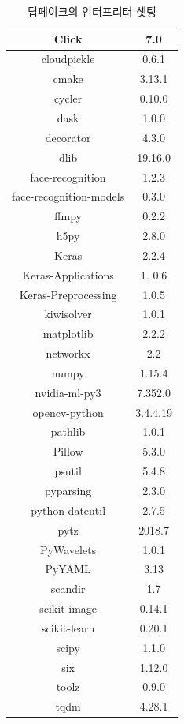 \documentclass[chapter,oneside]{oblivoir}
\begin{document}
\begin{table}[h!]
\centering
\begin{tabular}{|c|c|}
    \hline\hline
    Click & 7.0 \\ \hline
    cloudpickle & 0.6.1 \\ \hline
    cmake & 3.13.1 \\ \hline
    cycler& 0.10.0 \\ \hline
    dask & 1.0.0 \\ \hline
    decorator & 4.3.0 \\ \hline
    dlib & 19.16.0 \\ \hline
    face-recognition &  1.2.3 \\ \hline
    face-recognition-models & 0.3.0 \\ \hline
    ffmpy & 0.2.2 \\ \hline
    h5py & 2.8.0 \\ \hline
    Keras & 2.2.4 \\ \hline
    Keras-Applications & 1. 0.6 \\ \hline
    Keras-Preprocessing & 1.0.5 \\ \hline
    kiwisolver & 1.0.1 \\ \hline
    matplotlib & 2.2.2 \\ \hline
    networkx &  2.2 \\ \hline
    numpy & 1.15.4 \\ \hline
    nvidia-ml-py3 & 7.352.0 \\ \hline
    opencv-python & 3.4.4.19 \\ \hline
    pathlib & 1.0.1 \\ \hline
    Pillow & 5.3.0 \\ \hline
    psutil & 5.4.8 \\ \hline
    pyparsing & 2.3.0 \\ \hline
    python-dateutil & 2.7.5 \\ \hline
    pytz & 2018.7 \\ \hline
    PyWavelets &  1.0.1 \\ \hline
    PyYAML &  3.13 \\ \hline
    scandir & 1.7 \\ \hline
    scikit-image & 0.14.1 \\ \hline
    scikit-learn & 0.20.1 \\ \hline
    scipy & 1.1.0 \\ \hline
    six & 1.12.0 \\ \hline
    toolz  & 0.9.0 \\ \hline
    tqdm & 4.28.1 \\ \hline
    \hline\hline
\end{tabular}
\caption{딥페이크의 인터프리터 셋팅 }
\end{table}
\end{document}
